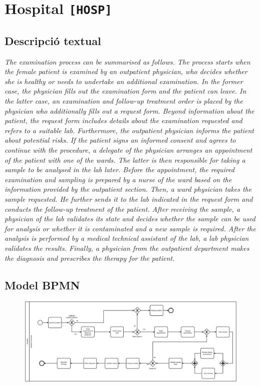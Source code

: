 \clearpage

\section{Hospital \texttt{[HOSP]}}

\subsection*{Descripció textual}

\textit{The examination process can be summarised as follows. The process starts when the female patient is examined by an outpatient physician, who decides whether she is healthy or needs to undertake an additional examination. In the former case, the physician fills out the examination form and the patient can leave. In the latter case, an examination and follow-up treatment order is placed by the physician who additionally fills out a request form. Beyond information about the patient, the request form includes details about the examination requested and refers to a suitable lab. Furthermore, the outpatient physician informs the patient about potential risks. If the patient signs an informed consent and agrees to continue with the procedure, a delegate of the physician arranges an appointment of the patient with one of the wards. The latter is then responsible for taking a sample to be analysed in the lab later. Before the appointment, the required examination and sampling is prepared by a nurse of the ward based on the information provided by the outpatient section. Then, a ward physician takes the sample requested. He further sends it to the lab indicated in the request form and conducts the follow-up treatment of the patient.  After receiving the sample, a physician of the lab validates its state and decides whether the sample can be used for analysis or whether it is contaminated and a new sample is required. After the analysis is performed by a medical technical assistant of the lab, a lab physician validates the results. Finally, a physician from the outpatient department makes the diagnosis and prescribes the therapy for the patient.}

\subsection*{Model BPMN}

\begin{figure}[!h]
    \centering
    \includegraphics[width=\textwidth]{figures/benchmark/Hospital.png}
\end{figure}


